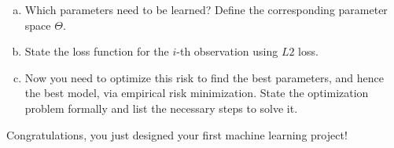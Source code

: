 \documentclass[a4paper]{article}
\begin{document}
{\begin{enumerate}[a)]
  State the hypothesis space for the corresponding model class.
  For this, assume the parameter vector $\thetab$ to include the intercept 
  coefficient.
  \item Which parameters need to be learned?
  Define the corresponding parameter space $\Theta$.
  \item State the loss function for the $i$-th observation using $L2$ loss. 
  \item Now you need to optimize this risk to find the best parameters, 
  and hence the best model, via empirical risk minimization. 
  State the optimization problem formally and list the necessary steps to solve 
  it. 

\end{enumerate}

Congratulations, you just designed your first machine learning project!

}
\dlz
\end{document}
